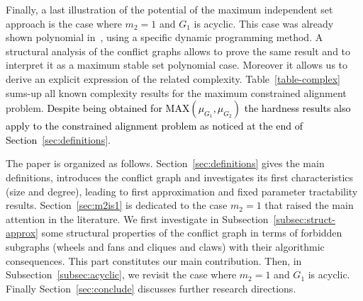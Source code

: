 \documentclass[final]{dmtcs-episciences}
\newcommand\mar[1]{\textcolor{black}{#1}}
\begin{document}
Finally, a last illustration of the potential of the maximum independent set approach is the case where $m_2=1$ and $G_1$ is acyclic. This case was already shown polynomial in~\citet{AbakaBE13}, using a specific dynamic programming method. A structural analysis of the conflict graphs allows to prove the same result and to interpret it as a maximum stable set polynomial case. Moreover it allows us to derive an explicit expression of the related complexity. Table~\ref{table-complex} sums-up all known complexity results for the maximum constrained alignment problem. \mar{Despite being obtained for {MAX}$(\mu_{G_1},\mu_{G_2})$ the hardness results also apply to the constrained alignment problem as noticed at the end of Section~\ref{sec:definitions}}.


 
 The paper is organized as follows. Section~\ref{sec:definitions} gives the main definitions, introduces the conflict graph and investigates its first characteristics (size and degree), leading  to first approximation and fixed parameter tractability results.
 Section~\ref{sec:m2is1} is dedicated to the case $m_2=1$ that raised the main attention in the literature.
 We first investigate in Subsection~\ref{subsec:struct-approx} some structural properties   of the conflict graph in terms of forbidden subgraphs (wheels and fans and cliques and claws) with their algorithmic consequences. This part constitutes our main contribution. Then, in Subsection~\ref{subsec:acyclic}, we revisit the case where $m_2=1$ and $G_1$ is acyclic. Finally Section~\ref{sec:conclude}  discusses further research directions.
 
\end{document}
